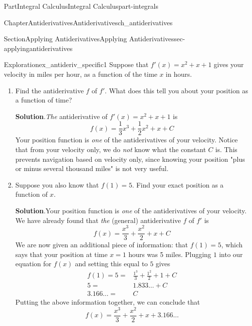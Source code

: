 \documentclass{tufte-book}
\newcommand{\blocktitlefont}{\relax}
\numberwithin{equation}{chapter}
\newcommand{\amp}{&}
\begin{document}
\begin{partptx}{Part}{Integral Calculus}{}{Integral Calculus}{}{}{part-integrals}
\begin{chapterptx}{Chapter}{Antiderivatives}{}{Antiderivatives}{}{}{ch_antiderivatives}
\begin{sectionptx}{Section}{Applying Antiderivatives}{}{Applying Antiderivatives}{}{}{sec-applyingantiderivatives}
%
\begin{exploration}{Exploration}{}{ex_antideriv_specific1}%
Suppose that \(f'(x) = x^2 + x + 1\) gives your velocity in miles per hour, as a function of the time \(x\) in hours.%
\begin{enumerate}[font=\bfseries,label=(\alph*),ref=\alph*]%
\item{}Find the antiderivative \(f\) of \(f'\).  What does this tell you about your position as a function of time?%
\par\smallskip%
\noindent\textbf{\blocktitlefont Solution}.\hypertarget{ex_antideriv_specific1-2-2}{}\quad{}\emph{The} antiderivative of \(f'(x) = x^2 + x + 1\) is%
\begin{equation*}
f(x) = \frac{1}{3}x^3 + \frac{1}{2} x^2 + x + C
\end{equation*}
Your position function is \emph{one} of the antiderivatives of your velocity. Notice that from your velocity only, we do \emph{not} know what the constant \(C\) is.  This prevents navigation based on velocity only, since knowing your position "plus or minus several thousand miles" is not very useful.%
\item{}Suppose you also know that \(f(1)=5\). Find your exact position as a function of \(x\).%
\par\smallskip%
\noindent\textbf{\blocktitlefont Solution}.\hypertarget{ex_antideriv_specific1-3-2}{}\quad{}Your position function is \emph{one} of the antiderivatives of your velocity. We have already found that \emph{the} (general) antiderivative \(f\) of \(f'\) is%
\begin{equation*}
f(x) = \frac{x^3}{3} + \frac{x^2}{2} + x + C
\end{equation*}
We are now given an additional piece of information: that \(f(1) = 5\), which says that your position at time \(x=1\) hours was 5 miles. Plugging \(1\) into our equation for \(f(x)\) and setting this equal to \(5\) gives%
\begin{align*}
f(1) = 5 = \amp \frac{1^3}{3} + \frac{1^2}{2} + 1 + C \\
5 = \amp 1.833\dots + C\\
3.166\dots = \amp C 
\end{align*}
Putting the above information together, we can conclude that%
\begin{equation*}
f(x) = \frac{x^3}{3} + \frac{x^2}{2} + x + 3.166\dots
\end{equation*}

\end{enumerate}
\end{exploration}
\end{sectionptx}
\end{chapterptx}
\end{partptx}
\end{document}
